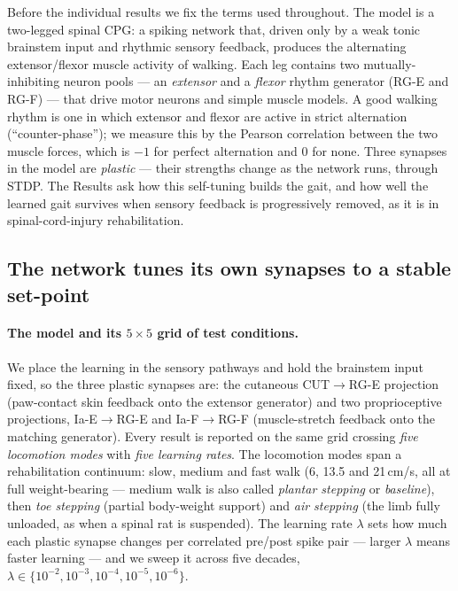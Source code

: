 
Before the individual results we fix the terms used throughout. The model is a
two-legged spinal CPG: a spiking network that,
driven only by a weak tonic brainstem input and rhythmic sensory feedback,
produces the alternating extensor/flexor muscle activity of walking. Each leg
contains two mutually-inhibiting neuron pools --- an \emph{extensor} and a
\emph{flexor} rhythm generator (RG-E and RG-F) --- that drive motor neurons and
simple muscle models. A good walking rhythm is one in which extensor and flexor
are active in strict alternation (``counter-phase''); we measure this by the
Pearson correlation between the two muscle forces, which is $-1$ for perfect
alternation and $0$ for none. Three synapses in the model are \emph{plastic} ---
their strengths change as the network runs, through STDP. The Results ask
how this self-tuning builds the gait, and how
well the learned gait survives when sensory feedback is progressively removed,
as it is in spinal-cord-injury rehabilitation.

\subsection{The network tunes its own synapses to a stable set-point}\label{sec:results:weights}

\paragraph{The model and its $5\times5$ grid of test conditions.}
We place the learning in the sensory pathways and hold the brainstem input
fixed, so the three plastic synapses are: the cutaneous CUT$\to$RG-E projection
(paw-contact skin feedback onto the extensor generator) and two proprioceptive
projections, Ia-E$\to$RG-E and Ia-F$\to$RG-F (muscle-stretch feedback onto the
matching generator). Every result is reported on the same grid crossing
\emph{five locomotion modes} with \emph{five learning rates}. The locomotion
modes span a rehabilitation continuum: slow, medium and fast walk (6, 13.5 and
21\,cm/s, all at full weight-bearing --- medium walk is also called
\emph{plantar stepping} or \emph{baseline}), then \emph{toe stepping} (partial
body-weight support) and \emph{air stepping} (the limb fully unloaded, as when a
spinal rat is suspended). The learning rate $\lambda$ sets how much each plastic
synapse changes per correlated pre/post spike pair --- larger $\lambda$ means
faster learning --- and we sweep it across five decades,
$\lambda\in\{10^{-2},10^{-3},10^{-4},10^{-5},10^{-6}\}$.


